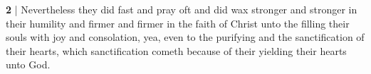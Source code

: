 			\begin{compactdesc}
				\item[{\hyperref[HELAMAN-3-35]{Helaman 3:35}}] \textbf{2} | Nevertheless they did fast and pray oft and did wax stronger and stronger in their humility and firmer and firmer in the faith of Christ unto the filling their souls with joy and consolation, yea, even to the purifying and the sanctification of their hearts, which sanctification cometh because of their yielding their hearts unto God. 
			\end{compactdesc}
		
	
		
		
	
		
		

	
